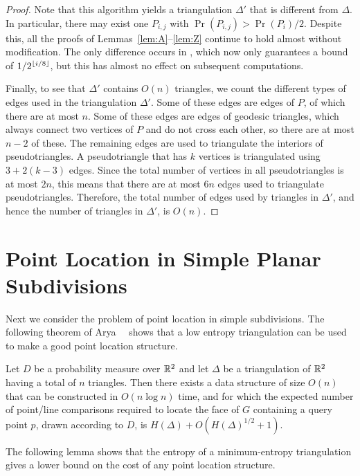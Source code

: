 \documentclass[acmtalg]{acmsmall}
\begin{document}
\begin{proof}
Note that this algorithm yields a triangulation $\Delta'$ that is
different from $\Delta$.  In particular, there may exist one $P_{i,j}$
with $\Pr(P_{i,j})>\Pr(P_i)/2$.  Despite this, all the proofs of
Lemmas~\ref{lem:A}--\ref{lem:Z} continue to hold almost without modification.
The only difference occurs in , which now only
guarantees a bound of $1/2^{\left\lfloor i/8 \right\rfloor}$, 
but this has almost no effect on subsequent computations.

Finally, to see that $\Delta'$ contains $O(n)$
triangles, we count the different types of edges used in the
triangulation $\Delta'$.  Some of these edges are edges of $P$, of
which there are at most $n$.  Some of these edges are edges of
geodesic triangles,
which always connect two vertices of $P$ and do not cross each other,
so there are at most $n-2$ of these.  The remaining edges are used to
triangulate the interiors of pseudotriangles.  A pseudotriangle that has $k$ vertices
is triangulated using $3 + 2(k-3)$ edges.  Since the total number of
vertices in all pseudotriangles is at most $2n$, this means that there are at
most $6n$ edges used to triangulate pseudotriangles.  Therefore, the total
number of edges used by triangles in $\Delta'$, and hence the number
of triangles in $\Delta'$, is $O(n)$.  
\end{proof}

\section{Point Location in Simple Planar Subdivisions}

Next we consider the problem of point location in simple
subdivisions.  The following theorem of Arya~\etal~\cite{ammw07}
shows that a low entropy triangulation can be used to make a good
point location structure.

\begin{thm}
Let $D$ be a probability measure over $\mathbb{R}^2$ and let $\Delta$ be a
triangulation of $\mathbb{R}^2$ having a total of $n$ triangles.  Then there exists a
data structure of size $O(n)$ that can be constructed in $O(n\log n)$
time, and for which the expected number of point/line comparisons
required to locate the face of $G$ containing a query point $p$, drawn
according to $D$, is $H(\Delta) + O(H(\Delta)^{1/2}+1)$.
\end{thm}

The following lemma shows that the entropy of a minimum-entropy
triangulation gives a lower bound on the cost of any point location
structure.
\end{document}

